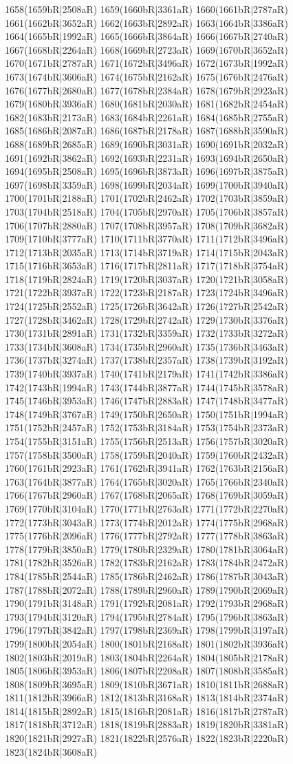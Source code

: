 1658(1659bR|2508aR) 1659(1660bR|3361aR) 1660(1661bR|2787aR) 1661(1662bR|3652aR) 1662(1663bR|2892aR) 1663(1664bR|3386aR) 1664(1665bR|1992aR) 1665(1666bR|3864aR) 1666(1667bR|2740aR) 1667(1668bR|2264aR) 1668(1669bR|2723aR) 1669(1670bR|3652aR) 1670(1671bR|2787aR) 1671(1672bR|3496aR) 1672(1673bR|1992aR) 1673(1674bR|3606aR) 1674(1675bR|2162aR) 1675(1676bR|2476aR) 1676(1677bR|2680aR) 1677(1678bR|2384aR) 1678(1679bR|2923aR) 1679(1680bR|3936aR) 1680(1681bR|2030aR) 1681(1682bR|2454aR) 1682(1683bR|2173aR) 1683(1684bR|2261aR) 1684(1685bR|2755aR) 1685(1686bR|2087aR) 1686(1687bR|2178aR) 1687(1688bR|3590aR) 1688(1689bR|2685aR) 1689(1690bR|3031aR) 1690(1691bR|2032aR) 1691(1692bR|3862aR) 1692(1693bR|2231aR) 1693(1694bR|2650aR) 1694(1695bR|2508aR) 1695(1696bR|3873aR) 1696(1697bR|3875aR) 1697(1698bR|3359aR) 1698(1699bR|2034aR) 1699(1700bR|3940aR) 1700(1701bR|2188aR) 1701(1702bR|2462aR) 1702(1703bR|3859aR) 1703(1704bR|2518aR) 1704(1705bR|2970aR) 1705(1706bR|3857aR) 1706(1707bR|2880aR) 1707(1708bR|3957aR) 1708(1709bR|3682aR) 1709(1710bR|3777aR) 1710(1711bR|3770aR) 1711(1712bR|3496aR) 1712(1713bR|2035aR) 1713(1714bR|3719aR) 1714(1715bR|2043aR) 1715(1716bR|3653aR) 1716(1717bR|2811aR) 1717(1718bR|3754aR) 1718(1719bR|2824aR) 1719(1720bR|3037aR) 1720(1721bR|3058aR) 1721(1722bR|3937aR) 1722(1723bR|2187aR) 1723(1724bR|3496aR) 1724(1725bR|2552aR) 1725(1726bR|3642aR) 1726(1727bR|2542aR) 1727(1728bR|3462aR) 1728(1729bR|2742aR) 1729(1730bR|3376aR) 1730(1731bR|2891aR) 1731(1732bR|3359aR) 1732(1733bR|3272aR) 1733(1734bR|3608aR) 1734(1735bR|2960aR) 1735(1736bR|3463aR) 1736(1737bR|3274aR) 1737(1738bR|2357aR) 1738(1739bR|3192aR) 1739(1740bR|3937aR) 1740(1741bR|2179aR) 1741(1742bR|3386aR) 1742(1743bR|1994aR) 1743(1744bR|3877aR) 1744(1745bR|3578aR) 1745(1746bR|3953aR) 1746(1747bR|2883aR) 1747(1748bR|3477aR) 1748(1749bR|3767aR) 1749(1750bR|2650aR) 1750(1751bR|1994aR) 1751(1752bR|2457aR) 1752(1753bR|3184aR) 1753(1754bR|2373aR) 1754(1755bR|3151aR) 1755(1756bR|2513aR) 1756(1757bR|3020aR) 1757(1758bR|3500aR) 1758(1759bR|2040aR) 1759(1760bR|2432aR) 1760(1761bR|2923aR) 1761(1762bR|3941aR) 1762(1763bR|2156aR) 1763(1764bR|3877aR) 1764(1765bR|3020aR) 1765(1766bR|2340aR) 1766(1767bR|2960aR) 1767(1768bR|2065aR) 1768(1769bR|3059aR) 1769(1770bR|3104aR) 1770(1771bR|2763aR) 1771(1772bR|2270aR) 1772(1773bR|3043aR) 1773(1774bR|2012aR) 1774(1775bR|2968aR) 1775(1776bR|2096aR) 1776(1777bR|2792aR) 1777(1778bR|3863aR) 1778(1779bR|3850aR) 1779(1780bR|2329aR) 1780(1781bR|3064aR) 1781(1782bR|3526aR) 1782(1783bR|2162aR) 1783(1784bR|2472aR) 1784(1785bR|2544aR) 1785(1786bR|2462aR) 1786(1787bR|3043aR) 1787(1788bR|2072aR) 1788(1789bR|2960aR) 1789(1790bR|2069aR) 1790(1791bR|3148aR) 1791(1792bR|2081aR) 1792(1793bR|2968aR) 1793(1794bR|3120aR) 1794(1795bR|2784aR) 1795(1796bR|3863aR) 1796(1797bR|3842aR) 1797(1798bR|2369aR) 1798(1799bR|3197aR) 1799(1800bR|2054aR) 1800(1801bR|2168aR) 1801(1802bR|3936aR) 1802(1803bR|2019aR) 1803(1804bR|2264aR) 1804(1805bR|2178aR) 1805(1806bR|3953aR) 1806(1807bR|2208aR) 1807(1808bR|3585aR) 1808(1809bR|3695aR) 1809(1810bR|3671aR) 1810(1811bR|2688aR) 1811(1812bR|3966aR) 1812(1813bR|3168aR) 1813(1814bR|2374aR) 1814(1815bR|2892aR) 1815(1816bR|2081aR) 1816(1817bR|2787aR) 1817(1818bR|3712aR) 1818(1819bR|2883aR) 1819(1820bR|3381aR) 1820(1821bR|2927aR) 1821(1822bR|2576aR) 1822(1823bR|2220aR) 1823(1824bR|3608aR) 